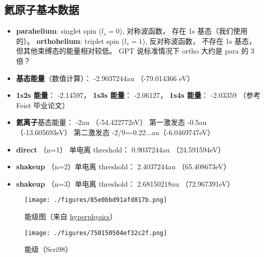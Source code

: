 

\subsection{氦原子基本数据}

\begin{itemize}
\item \textbf{parahelium}: singlet spin ($l_s=0$), 对称波函数， 存在 1s 基态（我们使用的）。 \textbf{orthohelium}: triplet spin ($l_s=1$), 反对称波函数， 不存在 1s 基态， 但其他束缚态的能量相对较低。 GPT 说标准情况下 ortho 大约是 para 的 3 倍？

\item \textbf{基态能量}（数值计算）： -2.9037244au （-79.014366 eV）

\item \textbf{1s2s 能量}： -2.14597， \textbf{1s3s 能量}： -2.06127， \textbf{1s4s 能量}： -2.03359 （参考 Feist 毕业论文）
\item \textbf{氦离子}基态能量： -2au （-54.422772eV） 第一激发态 -0.5au （-13.605693eV） 第二激发态 -2/9=-0.22...au（-6.0469747eV）

\item \textbf{direct} （n=1） 单电离 threshold： 0.9037244au （24.591594eV）

\item \textbf{shakeup} （n=2）单电离 threshold： 2.4037244au （65.408673eV）

\item \textbf{shakeup} （n=3）单电离 threshold： 2.68150218au （72.967391eV）
\end{itemize}

\begin{figure}[ht]
\centering
\texttt{[image: ./figures/85e0bbd91afd817b.png]}
\caption{能级图（来自 \href{http://hyperphysics.phy-astr.gsu.edu/hbase/quantum/helium.html}{hyperphysics}）} \label{fig_HeAnal_3}
\end{figure}

\begin{figure}[ht]
\centering
\texttt{[image: ./figures/750150504ef32c2f.png]}
\caption{能级（Scri98）} \label{fig_HeAnal_4}
\end{figure}

